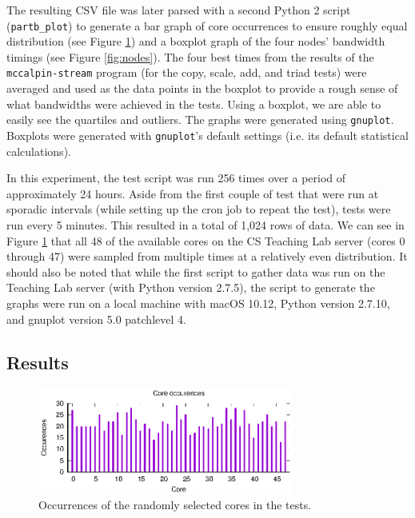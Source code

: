 \documentclass[11pt,twoside]{article}
\newcommand{\inlinecode}{\texttt}
\begin{document}
The resulting CSV file was later parsed with a second Python 2 script (\inlinecode{partb\_plot}) to generate a bar graph of core occurrences to ensure roughly equal distribution (see Figure \ref{fig:cores}) and a boxplot graph of the four nodes' bandwidth timings (see Figure \ref{fig:nodes}). The four best times from the results of the \inlinecode{mccalpin-stream} program (for the copy, scale, add, and triad tests) were averaged and used as the data points in the boxplot to provide a rough sense of what bandwidths were achieved in the tests. Using a boxplot, we are able to easily see the quartiles and outliers. The graphs were generated using \inlinecode{gnuplot}. Boxplots were generated with \inlinecode{gnuplot}'s default settings (i.e. its default statistical calculations).

In this experiment, the test script was run 256 times over a period of approximately 24 hours. Aside from the first couple of test that were run at sporadic intervals (while setting up the cron job to repeat the test), tests were run every 5 minutes. This resulted in a total of 1,024 rows of data. We can see in Figure \ref{fig:cores} that all 48 of the available cores on the CS Teaching Lab server (cores 0 through 47) were sampled from multiple times at a relatively even distribution. It should also be noted that while the first script to gather data was run on the Teaching Lab server (with Python version 2.7.5), the script to generate the graphs were run on a local machine with macOS 10.12, Python version 2.7.10, and gnuplot version 5.0 patchlevel 4.


\subsection{Results}

\begin{figure}
    \centering
    \includegraphics[width=0.75\textwidth]{partb_cpus}
    \caption{Occurrences of the randomly selected cores in the tests.}
    \label{fig:cores}
\end{figure}
\end{document}
